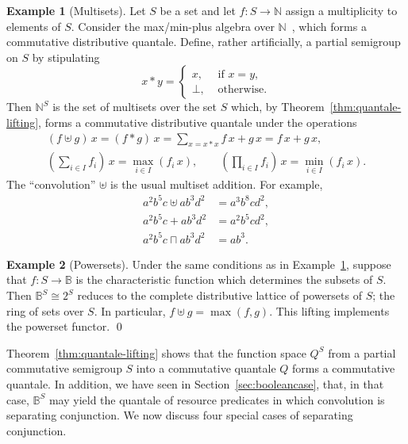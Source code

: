 \documentclass[12pt]{article}
\theoremstyle{definition}
\newtheorem{example}{Example}
\begin{document}
\begin{example}[Multisets]\label{ex:multisets}
  Let $S$ be a set and let $f:S\to\mathbb{N}$ assign a multiplicity to
  elements of $S$. Consider the max/min-plus algebra over
  $\mathbb{N}$~\cite{GondranMinoux}, which forms a commutative
  distributive quantale. Define, rather artificially, a partial
  semigroup on $S$ by stipulating
  \begin{equation*}
    x\ast y=
    \begin{cases}
      x, &\text{ if } x=y,\\
      \bot, &\text{ otherwise}.
    \end{cases}
  \end{equation*}
  Then $\mathbb{N}^S$ is the set of multisets over the set $S$ which,
  by Theorem~\ref{thm:quantale-lifting}, forms a commutative
  distributive quantale under the operations
  \begin{gather*}
    (f\uplus g)\, x = (f\ast g)\, x= \sum_{x=x\ast x} f\, x + g\, x = f\, x + g\, x,\\
    (\sum_{i\in I}f_i)\, x = \max_{i\in I}(f_i\, x),\qquad
(\prod_{i\in I}f_i)\, x = \min_{i\in I}(f_i\, x).
  \end{gather*}
  The ``convolution'' $\uplus$ is the usual multiset addition. For
  example,
\begin{align*}
 a^2b^5c\uplus ab^3d^2 &=a^3b^8cd^2,\\
a^2b^5c+ ab^3d^2 &=a^2b^5cd^2,\\
a^2b^5c\sqcap ab^3d^2 &=ab^3. 
\end{align*}
\end{example}

\begin{example}[Powersets]\label{ex:powersets}
  Under the same conditions as in Example~\ref{ex:multisets}, suppose
  that $f:S\to\mathbb{B}$ is the characteristic function which
  determines the subsets of $S$. Then $\mathbb{B}^S\cong 2^S$ reduces
  to the complete distributive lattice of powersets of $S$; the ring
  of sets over $S$. In particular, $f\uplus g= \max(f,g)$. This
  lifting implements the powerset functor. \qed
\end{example}

Theorem~\ref{thm:quantale-lifting} shows that the function space $Q^S$
from a partial commutative semigroup $S$ into a commutative quantale
$Q$ forms a commutative quantale. In addition, we have seen in
Section~\ref{sec:booleancase}, that, in that case, $\mathbb{B}^S$ may
yield the quantale of resource predicates in which convolution is
separating conjunction. We now discuss four special cases of
separating conjunction.
\end{document}
